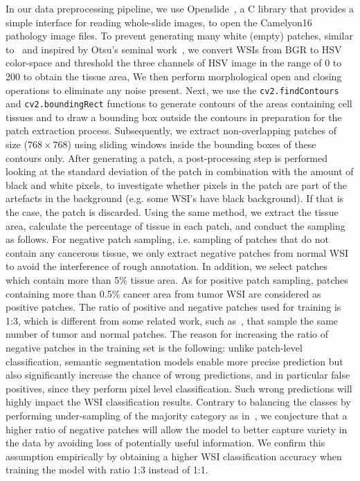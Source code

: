 In our data preprocessing pipeline, we use Openslide~\cite{GOODE201327}, a C library that provides a simple interface for reading whole-slide images, to open the Camelyon16 pathology image files. To prevent generating many white (empty) patches, similar to~\cite{khened2021generalized} and inspired by Otsu's seminal work~\cite{4310076}, we convert WSIs from BGR to HSV color-space and threshold the three channels of HSV image in the range of 0 to 200 to obtain the tissue area,  We then perform morphological open and closing operations to eliminate any noise present. Next, we use the \texttt{cv2.findContours} and \texttt{cv2.boundingRect} functions to generate contours of the areas containing cell tissues and to draw a bounding box outside the contours in preparation for the patch extraction process. Subsequently, we extract non-overlapping patches of size ($768\times768$) using sliding windows inside the bounding boxes of these contours only. After generating a patch, a post-processing step is performed looking at the standard deviation of the patch in combination with the amount of black and white pixels, to investigate whether pixels in the patch are part of the artefacts in the background (e.g. some WSI's have black background). If that is the case, the patch is discarded. Using the same method, we extract the tissue area, calculate the percentage of tissue in each patch, and conduct the sampling as follows. For negative patch sampling, i.e. sampling of patches that do not contain any cancerous tissue, we only extract negative patches from normal WSI to avoid the interference of rough annotation. In addition, we select patches which contain more than 5\% tissue area. As for positive patch sampling, patches containing more than 0.5\% cancer area from tumor WSI are considered as positive patches. The ratio of positive and negative patches used for training is 1:3, which is different from some related work, such as~\cite{Lee2018,Li2018}, that sample the same number of tumor and normal patches. The reason for increasing the ratio of negative patches in the training set is the following: unlike patch-level classification, semantic segmentation models enable more precise prediction but also significantly increase the chance of wrong predictions, and in particular false positives, since they perform pixel level classification. Such wrong predictions will highly impact the WSI classification results. Contrary to balancing the classes by performing under-sampling of the majority category as in~\cite{Lee2018,Li2018}, we conjecture that a higher ratio of negative patches will allow the model to better capture variety in the data by avoiding loss of potentially useful information. We confirm this assumption empirically by obtaining a higher WSI classification accuracy when training the model with ratio 1:3 instead of 1:1.

